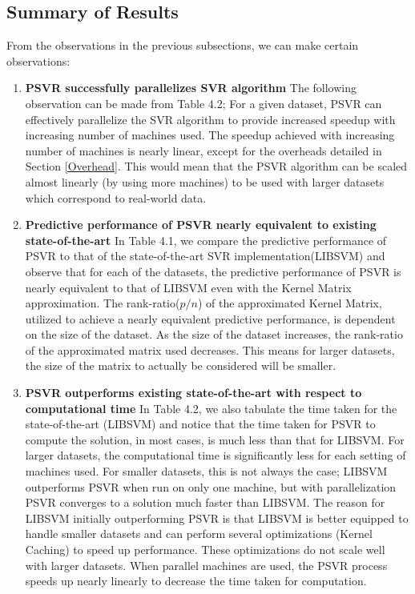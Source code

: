 \documentclass[12pt]{article}
\begin{document}
\subsection{Summary of Results}
\label{Summary of Results}
From the observations in the previous subsections, we can make certain observations:
\begin{enumerate}[label=(\alph*)]
\item {\bf PSVR successfully parallelizes SVR algorithm}
\newline
The following observation can be made from Table 4.2; For a given dataset, PSVR can effectively parallelize the SVR algorithm to provide increased speedup with increasing number of machines used. The speedup achieved with increasing number of machines is nearly linear, except for the overheads detailed in Section \ref{Overhead}. This would  mean that the PSVR algorithm can be scaled almost linearly (by using more machines) to be used with larger datasets which correspond to real-world data.

\item {\bf Predictive performance of PSVR nearly equivalent to existing state-of-the-art}
\newline
In Table 4.1, we compare the predictive performance of PSVR to that of the state-of-the-art SVR implementation(LIBSVM) and observe that for each of the datasets, the predictive performance of PSVR is nearly equivalent to that of LIBSVM even with the Kernel Matrix approximation.
\newline
The rank-ratio($p/n$) of the approximated Kernel Matrix, utilized to achieve a nearly equivalent predictive performance, is dependent on the size of the dataset. As the size of the dataset increases, the rank-ratio of the approximated matrix used decreases. This means for larger datasets, the size of the matrix to actually be considered will be smaller.

\item {\bf PSVR outperforms existing state-of-the-art with respect to computational time}
\newline
In Table 4.2, we also tabulate the time taken for the state-of-the-art (LIBSVM) and notice that the time taken for PSVR to compute the solution, in most cases, is much less than that for LIBSVM. For larger datasets, the computational time is significantly less for each setting of machines used. 
\newline
For smaller datasets, this is not always the case; LIBSVM outperforms PSVR when run on only one machine, but with parallelization PSVR converges to a solution much faster than LIBSVM. The reason for LIBSVM initially outperforming PSVR is that LIBSVM is better equipped to handle smaller datasets and can perform several optimizations (Kernel Caching) to speed up performance. These optimizations do not scale well with larger datasets. When parallel machines are used, the PSVR process speeds up nearly linearly to decrease the time taken for computation.
\end{enumerate}
\cleardoublepage
\end{document}
